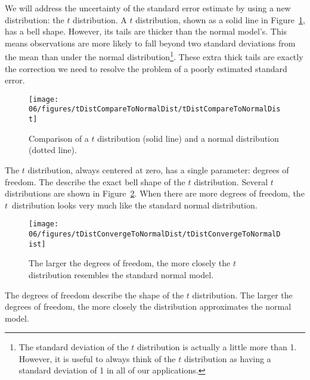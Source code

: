 We will address the uncertainty of the standard error estimate by using a new distribution: the $t$ distribution. A $t$ distribution, shown as a solid line in Figure~\ref{tDistCompareToNormalDist}, has a bell shape. However, its tails are thicker than the normal model's. 
This means observations are more likely to fall beyond two standard deviations from the mean than under the normal distribution\footnote{The standard deviation of the $t$ distribution is actually a little more than 1. However, it is useful to always think of the $t$ distribution as having a standard deviation of 1 in all of our applications.}.
These extra thick tails are exactly the correction we need to resolve the problem of a poorly estimated standard error.

\begin{figure}
\centering
\texttt{[image: 06/figures/tDistCompareToNormalDist/tDistCompareToNormalDist]}
\caption{Comparison of a $t$ distribution (solid line) and a normal distribution (dotted line).}
\label{tDistCompareToNormalDist}
\end{figure}

The $t$ distribution, always centered at zero, has a single parameter: degrees of freedom. The  describe the exact bell shape of the $t$ distribution. Several $t$ distributions are shown in Figure~\ref{tDistConvergeToNormalDist}. When there are more degrees of freedom, the $t$~distribution looks very much like the standard normal distribution.

\begin{figure}
\centering
\texttt{[image: 06/figures/tDistConvergeToNormalDist/tDistConvergeToNormalDist]}
\caption{The larger the degrees of freedom, the more closely the $t$ distribution resembles the standard normal model.}\vspace{-2mm}
\label{tDistConvergeToNormalDist}
\end{figure}

\begin{termBox}{
The degrees of freedom describe the shape of the $t$ distribution. The larger the degrees of freedom, the more closely the distribution approximates the normal model.}
\end{termBox}

